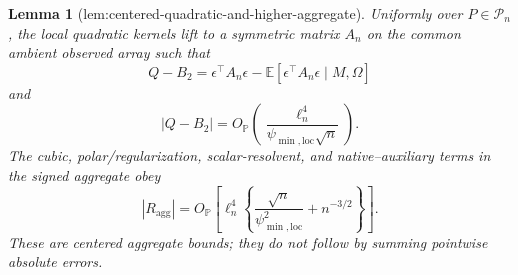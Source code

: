 \documentclass{article}
\newtheorem{lemma}{Lemma}
\begin{document}
\begin{lemma}[lem:centered-quadratic-and-higher-aggregate]\label{lem:centered-quadratic-and-higher-aggregate}
Uniformly over \(P\in\mathcal P_n\), the local quadratic kernels lift to a symmetric matrix \(A_n\) on the common ambient observed array such that
\[
 Q-B_2=\epsilon^{\top}A_n\epsilon
 -\mathbb E[\epsilon^{\top}A_n\epsilon\mid M,\Omega]
\]
and
\[
 |Q-B_2|=O_{\mathbb P}\!\left(
 \frac{\ell_n^4}{\psi_{\min,\mathrm{loc}}\sqrt n}\right).
\]
The cubic, polar/regularization, scalar-resolvent, and native--auxiliary terms in the signed aggregate obey
\[
 |R_{\mathrm{agg}}|=O_{\mathbb P}\!\left[
 \ell_n^4\left\{\frac{\sqrt n}{\psi_{\min,\mathrm{loc}}^2}
 +n^{-3/2}\right\}\right].
\]
These are centered aggregate bounds; they do not follow by summing pointwise absolute errors.
\end{lemma}
\end{document}
